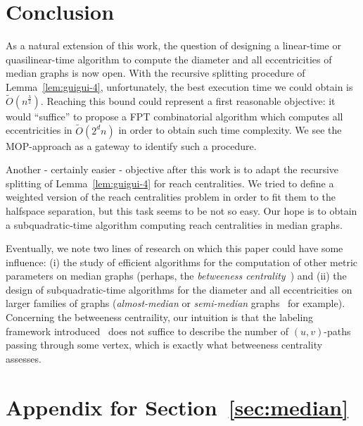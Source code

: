 \documentclass[a4paper,UKenglish,numberwithinsect,cleveref, autoref]{lipics-v2021}
\begin{document}
\section{Conclusion} \label{sec:conclusion}

As a natural extension of this work, the question of designing a linear-time or quasilinear-time algorithm to compute
the diameter and all eccentricities of median graphs is now open. With the recursive splitting procedure of Lemma~\ref{lem:guigui-4}, unfortunately, the best execution time we could obtain is $\tilde{O}(n^{\frac{3}{2}})$. Reaching this bound could represent a first reasonable objective: it would ``suffice'' to propose a FPT combinatorial algorithm which computes all eccentricities in $\tilde{O}(2^dn)$ in order to obtain such time complexity. We see the MOP-approach as a gateway to identify such a procedure.

Another - certainly easier - objective after this work is to adapt the recursive splitting of Lemma~\ref{lem:guigui-4} for reach centralities. We tried to define a weighted version of the reach centralities problem in order to fit them to the halfspace separation, but this task seems to be not so easy. Our hope is to obtain a subquadratic-time algorithm computing reach centralities in median graphs. 

Eventually, we note two lines of research on which this paper could have some influence: (i) the study of efficient algorithms for the computation of other metric parameters on median graphs (perhaps, the \textit{betweeness centrality}~\cite{AbGrWi15}) and (ii) the design of subquadratic-time algorithms for the diameter and all eccentricities on larger families of graphs (\textit{almost-median} or \textit{semi-median} graphs~\cite{Br07,KlSh12} for example). Concerning the betweeness centraility, our intuition is that the labeling framework introduced~\cite{BeHa21} does not suffice to describe the number of $(u,v)$-paths passing through some vertex, which is exactly what betweeness centrality assesses.

\newpage



\newpage

\appendix

\section{Appendix for Section~\ref{sec:median}} \label{asec:median}
\end{document}
